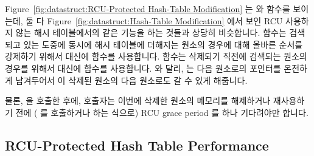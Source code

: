 Figure~\ref{fig:datastruct:RCU-Protected Hash-Table Modification} 는
 와  함수를 보이는데, 둘 다
Figure~\ref{fig:datastruct:Hash-Table Modification} 에서 보인 RCU 사용하지 않는
해시 테이블에서의 같은 기능을 하는 것들과 상당히 비슷합니다.
 함수는 검색되고 있는 도중에 동시에 해시 테이블에 더해지는
원소의 경우에 대해 올바른 순서를 강제하기 위해서  대신에
 함수를 사용합니다.
 함수는 삭제되기 직전에 검색되는 원소의 경우를 위해서
 대신에  함수를 사용합니다.
 와 달리,  는 다음 원소로의
포인터를 온전하게 남겨두어서  이 삭제된 원소의 다음
원소로도 갈 수 있게 해줍니다.

물론,  을 호출한 후에, 호출자는 이번에 삭제한 원소의 메모리를
해제하거나 재사용하기 전에 ( 를 호출하거나 하는 식으로)
RCU grace period 를 하나 기다려야만 합니다.

\subsection{RCU-Protected Hash Table Performance}
\label{sec:datastruct:RCU-Protected Hash Table Performance}

